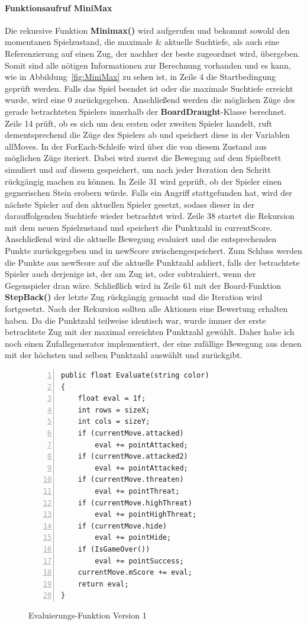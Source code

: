 \paragraph{Funktionsaufruf MiniMax}
Die rekursive Funktion \textbf{Minimax()} wird aufgerufen und bekommt sowohl den momentanen Spielzustand, die maximale \& aktuelle Suchtiefe, als auch eine Referenzierung auf einen Zug, der nachher der beste zugeordnet wird, übergeben. Somit sind alle nötigen Informationen zur Berechnung vorhanden und es kann, wie in Abbildung~\ref{fig:MiniMax}
zu sehen ist, in Zeile 4 die Startbedingung geprüft werden. Falls das Spiel beendet ist oder die maximale Suchtiefe erreicht wurde, wird eine 0 zurückgegeben. Anschließend werden die möglichen Züge des gerade betrachteten Spielers innerhalb der \textbf{BoardDraught}-Klasse berechnet. Zeile 14 prüft, ob es sich um den ersten oder zweiten Spieler handelt, ruft dementsprechend die Züge des Spielers ab und speichert diese in der Variablen allMoves. In der ForEach-Schleife wird über die von diesem Zustand aus möglichen Züge iteriert. Dabei wird zuerst die Bewegung auf dem Spielbrett simuliert und auf diesem gespeichert, um nach jeder Iteration den Schritt rückgängig machen zu können. In Zeile 31 wird geprüft, ob der Spieler einen gegnerischen Stein erobern würde. Falls ein Angriff stattgefunden hat, wird der nächste Spieler auf den aktuellen Spieler gesetzt, sodass dieser in der darauffolgenden Suchtiefe wieder betrachtet wird. Zeile 38 startet die Rekursion mit dem neuen Spielzustand und speichert die Punktzahl in currentScore. Anschließend wird die aktuelle Bewegung evaluiert und die entsprechenden Punkte zurückgegeben und in newScore zwischengespeichert. Zum Schluss werden die Punkte aus newScore auf die aktuelle Punktzahl addiert, falls der betrachtete Spieler auch derjenige ist, der am Zug ist, oder subtrahiert, wenn der Gegenspieler dran wäre. Schließlich wird in Zeile 61 mit der Board-Funktion \textbf{StepBack()} der letzte Zug rückgängig gemacht und die Iteration wird fortgesetzt. Nach der Rekursion sollten alle Aktionen eine Bewertung erhalten haben. Da die Punktzahl teilweise identisch war, wurde immer der erste betrachtete Zug mit der maximal erreichten Punktzahl gewählt. Daher habe ich noch einen Zufallsgenerator implementiert, der eine zufällige Bewegung aus denen mit der höchsten und selben Punktzahl auswählt und zurückgibt.\\
\begin{figure}[h]
\begin{lstlisting}[basicstyle=\scriptsize\ttfamily, numbers=left, stepnumber=1, numberstyle = \tiny]
public float Evaluate(string color)
{
	float eval = 1f;
	int rows = sizeX;
	int cols = sizeY;
	if (currentMove.attacked)
		eval += pointAttacked;
	if (currentMove.attacked2)
		eval += pointAttacked;
	if (currentMove.threaten)
		eval += pointThreat;
	if (currentMove.highThreat)
		eval += pointHighThreat;
	if (currentMove.hide)
		eval += pointHide;
	if (IsGameOver())
		eval += pointSuccess;
	currentMove.mScore += eval;
	return eval;
}
\end{lstlisting}
\caption{Evaluierungs-Funktion Version 1}
\label{fig:eval1}
\end{figure}
